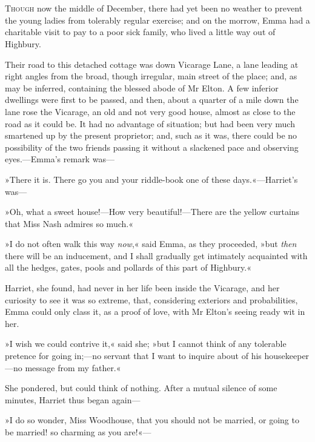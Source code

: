\chapter[Chapter \thechapter]{}
\lettrine[lines=4,lraise=0.3]{T}{hough} now the middle of December, there had yet been no weather to prevent the young ladies from tolerably regular exercise; and on the morrow, Emma had a charitable visit to pay to a poor sick family, who lived a little way out of Highbury.

Their road to this detached cottage was down Vicarage Lane, a lane leading at right angles from the broad, though irregular, main street of the place; and, as may be inferred, containing the blessed abode of Mr Elton. A few inferior dwellings were first to be passed, and then, about a quarter of a mile down the lane rose the Vicarage, an old and not very good house, almost as close to the road as it could be. It had no advantage of situation; but had been very much smartened up by the present proprietor; and, such as it was, there could be no possibility of the two friends passing it without a slackened pace and observing eyes.—Emma's remark was—

»There it is. There go you and your riddle-book one of these days.«—Harriet's was—

»Oh, what a sweet house!—How very beautiful!—There are the yellow curtains that Miss Nash admires so much.«

»I do not often walk this way \textit{now},« said Emma, as they proceeded, »but \textit{then} there will be an inducement, and I shall gradually get intimately acquainted with all the hedges, gates, pools and pollards of this part of Highbury.«

Harriet, she found, had never in her life been inside the Vicarage, and her curiosity to see it was so extreme, that, considering exteriors and probabilities, Emma could only class it, as a proof of love, with Mr Elton's seeing ready wit in her.

»I wish we could contrive it,« said she; »but I cannot think of any tolerable pretence for going in;—no servant that I want to inquire about of his housekeeper—no message from my father.«

She pondered, but could think of nothing. After a mutual silence of some minutes, Harriet thus began again—

»I do so wonder, Miss Woodhouse, that you should not be married, or going to be married! so charming as you are!«—


